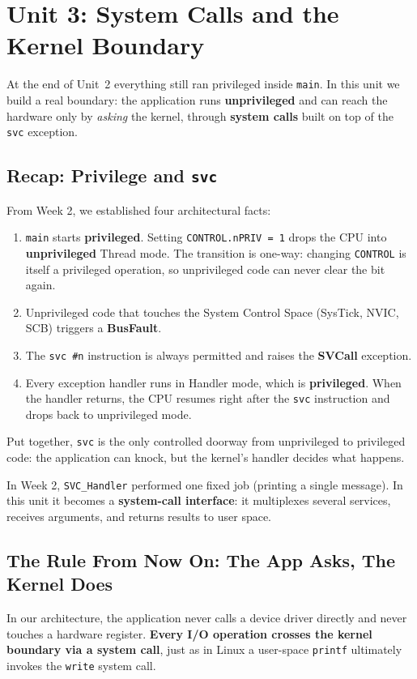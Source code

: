 \section{Unit 3: System Calls and the Kernel Boundary}

At the end of Unit~2 everything still ran privileged inside \texttt{main}. In this unit we build a real boundary: the application runs \textbf{unprivileged} and can reach the hardware only by \textit{asking} the kernel, through \textbf{system calls} built on top of the \texttt{svc} exception.

\subsection{Recap: Privilege and \texttt{svc}}
From Week 2, we established four architectural facts:
\begin{enumerate}
    \item \texttt{main} starts \textbf{privileged}. Setting \texttt{CONTROL.nPRIV = 1} drops the CPU into \textbf{unprivileged} Thread mode. The transition is one-way: changing \texttt{CONTROL} is itself a privileged operation, so unprivileged code can never clear the bit again.
    \item Unprivileged code that touches the System Control Space (SysTick, NVIC, SCB) triggers a \textbf{BusFault}.
    \item The \texttt{svc \#n} instruction is always permitted and raises the \textbf{SVCall} exception.
    \item Every exception handler runs in Handler mode, which is \textbf{privileged}. When the handler returns, the CPU resumes right after the \texttt{svc} instruction and drops back to unprivileged mode.
\end{enumerate}

Put together, \texttt{svc} is the only controlled doorway from unprivileged to privileged code: the application can knock, but the kernel's handler decides what happens.

In Week 2, \texttt{SVC\_Handler} performed one fixed job (printing a single message). In this unit it becomes a \textbf{system-call interface}: it multiplexes several services, receives arguments, and returns results to user space.

\subsection{The Rule From Now On: The App Asks, The Kernel Does}
In our architecture, the application never calls a device driver directly and never touches a hardware register. \textbf{Every I/O operation crosses the kernel boundary via a system call}, just as in Linux a user-space \texttt{printf} ultimately invokes the \texttt{write} system call.


